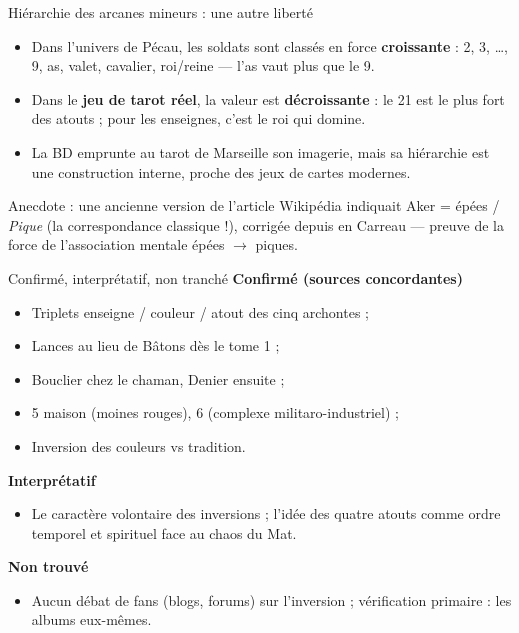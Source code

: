 \documentclass[11pt]{beamer}
\begin{document}
\begin{frame}{Hiérarchie des arcanes mineurs : une autre liberté}
\begin{itemize}
\item Dans l'univers de Pécau, les \og soldats \fg{} sont classés en force
\textbf{croissante} : 2, 3, \dots, 9, as, valet, cavalier, roi/reine ---
l'as vaut plus que le 9.
\item Dans le \textbf{jeu de tarot réel}, la valeur est \textbf{décroissante} :
le 21 est le plus fort des atouts ; pour les enseignes, c'est le roi qui
domine.
\item La BD emprunte au tarot de Marseille son imagerie, mais sa hiérarchie
est une construction interne, proche des jeux de cartes modernes.
\end{itemize}
\vspace{0.6em}
\small Anecdote : une ancienne version de l'article Wikipédia indiquait
\og Aker = épées / \emph{Pique} \fg{} (la correspondance classique !),
corrigée depuis en \og Carreau \fg{} --- preuve de la force de l'association
mentale épées $\rightarrow$ piques.
\end{frame}

\begin{frame}{Confirmé, interprétatif, non tranché}
\textbf{Confirmé (sources concordantes)}
\begin{itemize}
\item Triplets enseigne / couleur / atout des cinq archontes ;
\item \og Lances \fg{} au lieu de \og Bâtons \fg{} dès le tome 1 ;
\item \og Bouclier \fg{} chez le chaman, \og Denier \fg{} ensuite ;
\item 5\ieme{} maison (moines rouges), 6\ieme{} (complexe militaro-industriel) ;
\item Inversion des couleurs vs tradition.
\end{itemize}
\textbf{Interprétatif}
\begin{itemize}
\item Le caractère \og volontaire \fg{} des inversions ; l'idée des quatre
atouts comme \og ordre temporel et spirituel \fg{} face au chaos du Mat.
\end{itemize}
\textbf{Non trouvé}
\begin{itemize}
\item Aucun débat de fans (blogs, forums) sur l'inversion ;
vérification primaire : les albums eux-mêmes.
\end{itemize}
\end{frame}
\end{document}
